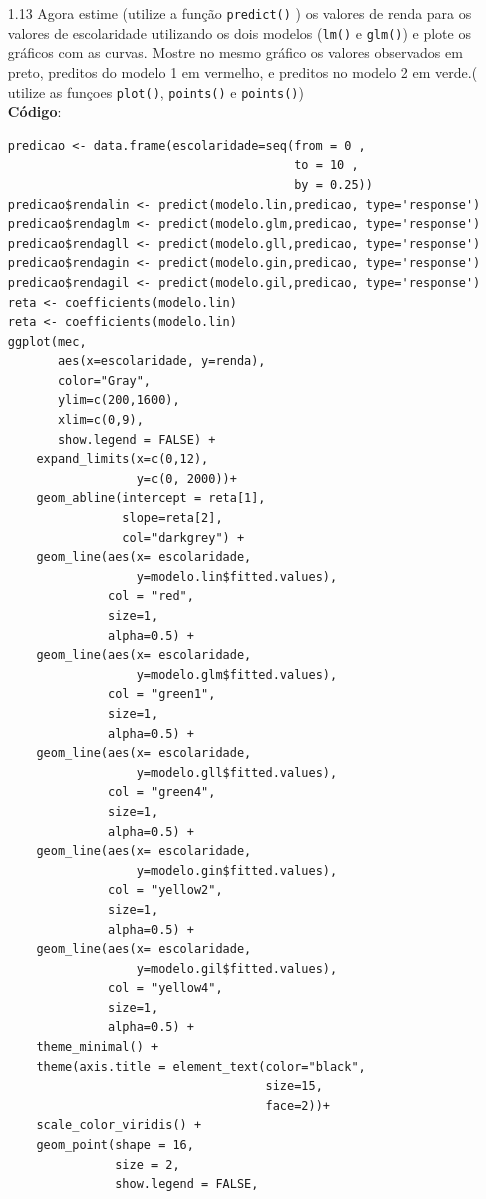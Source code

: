 \documentclass[a4paper,12pt]{article}
\begin{document}
\begin{enumerate}
\begin{enumerate}
        \item[1.13]	Agora estime (utilize a função \texttt{predict()} ) os valores de renda para os valores de escolaridade utilizando os dois modelos (\texttt{lm()} e \texttt{glm()}) e plote os gráficos com as curvas. Mostre no mesmo gráfico os valores observados em preto, preditos do \color{red}modelo 1 em vermelho\color{black}, e preditos no \color{green} modelo 2 em verde\color{black}.( utilize as funçoes \texttt{plot()}, \texttt{points()} e \texttt{points()})\\
        \textbf{Código}:
            \begin{lstlisting}
predicao <- data.frame(escolaridade=seq(from = 0 , 
                                        to = 10 , 
                                        by = 0.25))
predicao$rendalin <- predict(modelo.lin,predicao, type='response')
predicao$rendaglm <- predict(modelo.glm,predicao, type='response')
predicao$rendagll <- predict(modelo.gll,predicao, type='response')
predicao$rendagin <- predict(modelo.gin,predicao, type='response')
predicao$rendagil <- predict(modelo.gil,predicao, type='response')
reta <- coefficients(modelo.lin)
reta <- coefficients(modelo.lin)
ggplot(mec,
       aes(x=escolaridade, y=renda), 
       color="Gray",
       ylim=c(200,1600), 
       xlim=c(0,9),  
       show.legend = FALSE) +
    expand_limits(x=c(0,12), 
                  y=c(0, 2000))+
    geom_abline(intercept = reta[1], 
                slope=reta[2], 
                col="darkgrey") +
    geom_line(aes(x= escolaridade, 
                  y=modelo.lin$fitted.values), 
              col = "red", 
              size=1,  
              alpha=0.5) +
    geom_line(aes(x= escolaridade, 
                  y=modelo.glm$fitted.values), 
              col = "green1", 
              size=1,  
              alpha=0.5) +
    geom_line(aes(x= escolaridade, 
                  y=modelo.gll$fitted.values), 
              col = "green4", 
              size=1,  
              alpha=0.5) +
    geom_line(aes(x= escolaridade, 
                  y=modelo.gin$fitted.values), 
              col = "yellow2", 
              size=1,  
              alpha=0.5) +
    geom_line(aes(x= escolaridade, 
                  y=modelo.gil$fitted.values), 
              col = "yellow4", 
              size=1,  
              alpha=0.5) +
    theme_minimal() +
    theme(axis.title = element_text(color="black", 
                                    size=15, 
                                    face=2))+
    scale_color_viridis() +
    geom_point(shape = 16, 
               size = 2, 
               show.legend = FALSE, 

\end{lstlisting}
\end{enumerate}
\end{enumerate}
\end{document}
